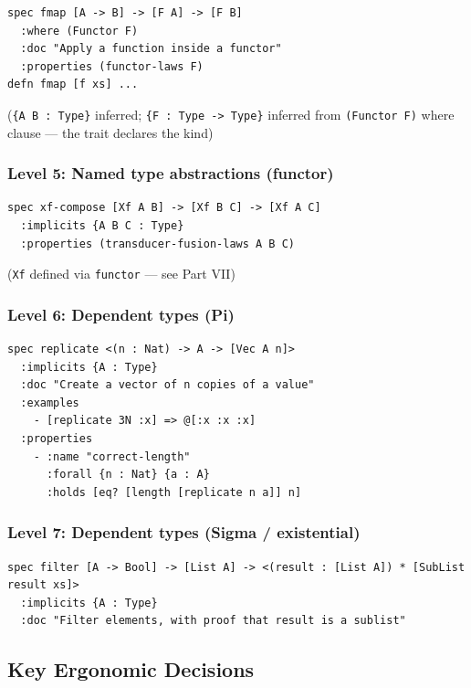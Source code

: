 \documentclass[11pt]{article}
\begin{document}
\begin{verbatim}
spec fmap [A -> B] -> [F A] -> [F B]
  :where (Functor F)
  :doc "Apply a function inside a functor"
  :properties (functor-laws F)
defn fmap [f xs] ...
\end{verbatim}

(\texttt{\{A B : Type\}} inferred; \texttt{\{F : Type -> Type\}} inferred from \texttt{(Functor F)}
where clause --- the trait declares the kind)
\subsubsection{Level 5: Named type abstractions (functor)}
\label{sec:org9f24479}

\begin{verbatim}
spec xf-compose [Xf A B] -> [Xf B C] -> [Xf A C]
  :implicits {A B C : Type}
  :properties (transducer-fusion-laws A B C)
\end{verbatim}

(\texttt{Xf} defined via \texttt{functor} --- see Part VII)
\subsubsection{Level 6: Dependent types (Pi)}
\label{sec:org037b864}

\begin{verbatim}
spec replicate <(n : Nat) -> A -> [Vec A n]>
  :implicits {A : Type}
  :doc "Create a vector of n copies of a value"
  :examples
    - [replicate 3N :x] => @[:x :x :x]
  :properties
    - :name "correct-length"
      :forall {n : Nat} {a : A}
      :holds [eq? [length [replicate n a]] n]
\end{verbatim}
\subsubsection{Level 7: Dependent types (Sigma / existential)}
\label{sec:org7e6c38f}

\begin{verbatim}
spec filter [A -> Bool] -> [List A] -> <(result : [List A]) * [SubList result xs]>
  :implicits {A : Type}
  :doc "Filter elements, with proof that result is a sublist"
\end{verbatim}
\subsection{Key Ergonomic Decisions}
\label{sec:orgcdf26c6}
\end{document}
